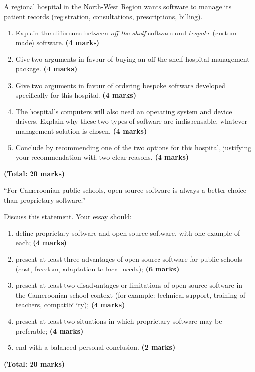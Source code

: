 \documentclass[11pt]{article}
\begin{document}
\begin{exercice}
A regional hospital in the North-West Region wants software to manage its patient records (registration, consultations, prescriptions, billing).
\begin{enumerate}
\item Explain the difference between \emph{off-the-shelf} software and \emph{bespoke} (custom-made) software. \textbf{(4 marks)}
\item Give two arguments in favour of buying an off-the-shelf hospital management package. \textbf{(4 marks)}
\item Give two arguments in favour of ordering bespoke software developed specifically for this hospital. \textbf{(4 marks)}
\item The hospital's computers will also need an operating system and device drivers. Explain why these two types of software are indispensable, whatever management solution is chosen. \textbf{(4 marks)}
\item Conclude by recommending one of the two options for this hospital, justifying your recommendation with two clear reasons. \textbf{(4 marks)}
\end{enumerate}
\textbf{(Total: 20 marks)}
\end{exercice}

\begin{exercice}
``For Cameroonian public schools, open source software is always a better choice than proprietary software.''

Discuss this statement. Your essay should:
\begin{enumerate}
\item define proprietary software and open source software, with one example of each; \textbf{(4 marks)}
\item present at least three advantages of open source software for public schools (cost, freedom, adaptation to local needs); \textbf{(6 marks)}
\item present at least two disadvantages or limitations of open source software in the Cameroonian school context (for example: technical support, training of teachers, compatibility); \textbf{(4 marks)}
\item present at least two situations in which proprietary software may be preferable; \textbf{(4 marks)}
\item end with a balanced personal conclusion. \textbf{(2 marks)}
\end{enumerate}
\textbf{(Total: 20 marks)}
\end{exercice}
\end{document}
